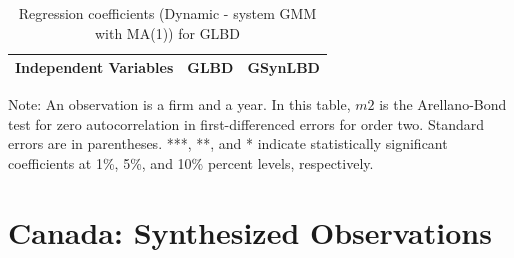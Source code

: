 \begin{table}[H]
  \centering
 \caption{Regression coefficients (Dynamic - system GMM with MA(1)) for GLBD} \label{Dynamic - system GMM with MA(1)} \medskip
\renewcommand{\arraystretch}{1}
\begin{tabular}{l|c| c}
\toprule
\textbf{Independent Variables}&\textbf{GLBD} &\textbf{GSynLBD}\\
\midrule

   \bottomrule
  \end{tabular} 
\begin{tablenotes}
\small
\item Note: An observation is a firm and a year. In this table, $m2$ is the Arellano-Bond test for zero autocorrelation in first-differenced errors for order two. Standard errors are in parentheses. ***, **, and * indicate statistically significant coefficients at 1\%, 5\%, and 10\% percent levels, respectively.
 \end{tablenotes}
\end{table}








%
%

%
%

\section{Canada: Synthesized Observations}
\label{sec:synth_obs}

